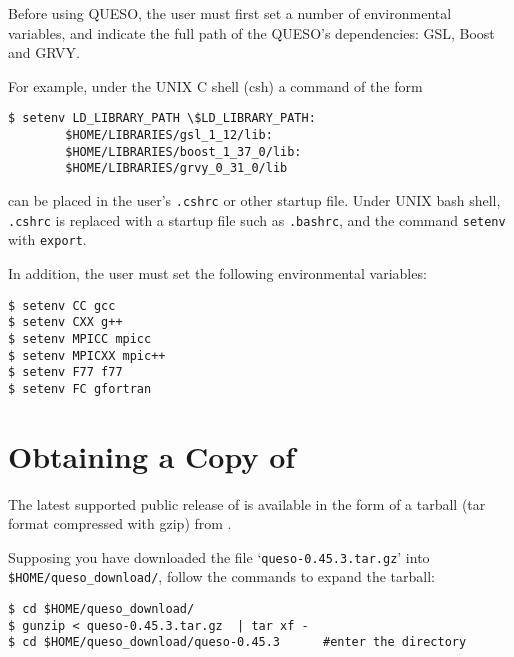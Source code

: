 

Before using QUESO, the user must first set a number of environmental variables, and indicate the full path
of the QUESO's dependencies: GSL, Boost and GRVY. 

For example, under the UNIX C shell (csh) a command of the form
\begin{lstlisting}
$ setenv LD_LIBRARY_PATH \$LD_LIBRARY_PATH:
		$HOME/LIBRARIES/gsl_1_12/lib:
		$HOME/LIBRARIES/boost_1_37_0/lib:
		$HOME/LIBRARIES/grvy_0_31_0/lib
\end{lstlisting}
can be placed in the user's \verb+.cshrc+ or other startup file. 
Under UNIX bash shell, {\tt.cshrc} is replaced with a startup file such as {\tt.bashrc}, and the command {\tt setenv} with \texttt{export}.

In addition, the user must set the following environmental
variables:
\begin{lstlisting}
$ setenv CC gcc
$ setenv CXX g++
$ setenv MPICC mpicc
$ setenv MPICXX mpic++
$ setenv F77 f77
$ setenv FC gfortran 
\end{lstlisting}



\section{Obtaining a Copy of \Queso{}}

The latest supported public release of \Queso{} is available in the form of a tarball (tar format compressed with gzip) from \Quesoweb{}.

Supposing you have downloaded the file `\verb+queso-0.45.3.tar.gz+' into \texttt{\$HOME/queso\_download/}, follow the commands to expand the tarball:
\begin{lstlisting}
$ cd $HOME/queso_download/
$ gunzip < queso-0.45.3.tar.gz  | tar xf -
$ cd $HOME/queso_download/queso-0.45.3   	#enter the directory 
\end{lstlisting}

